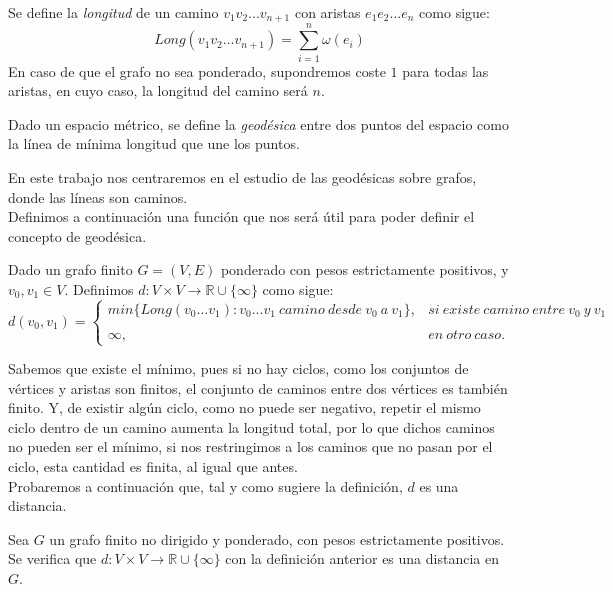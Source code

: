 \begin{definicion}
	Se define la \textit{longitud} de un camino $v_1v_2...v_{n+1}$ con aristas $e_1e_2...e_n$ como sigue: 
	$$Long(v_1v_2...v_{n+1}) = \sum_{i=1}^{n}\omega(e_i)$$
	En caso de que el grafo no sea ponderado, supondremos coste $1$ para todas las aristas, en cuyo caso, la longitud del camino será $n$.
\end{definicion}

\begin{definicion}
	Dado un espacio métrico, se define la \textit{geodésica} entre dos puntos del espacio como la línea de mínima longitud que une los puntos.
\end{definicion}

En este trabajo nos centraremos en el estudio de las geodésicas sobre grafos, donde las líneas son caminos. \\

Definimos a continuación una función que nos será útil para poder definir el concepto de geodésica.

\begin{definicion}\label{def:dist}
	Dado un grafo finito $G=(V,E)$ ponderado con pesos estrictamente positivos,  y $v_0,v_1\in V$. Definimos $d:V\times V \rightarrow \mathbb{R}\cup \{\infty\}$ como sigue:
	$$d(v_0,v_1)= \left\{ \begin{array}{lcc}
		min\{Long(v_0...v_1) : v_0...v_1\ camino\ desde\ v_0\ a\ v_1\}, &   si\ existe\ camino\ entre\ v_0\ y\ v_1 \\
		\\ \infty, &  en\ otro\ caso.
	\end{array}
	\right.$$
\end{definicion}

Sabemos que existe el mínimo, pues si no hay ciclos, como los conjuntos de vértices y aristas son finitos, el conjunto de caminos entre dos vértices es también finito. Y, de existir algún ciclo, como no puede ser negativo, repetir el mismo ciclo dentro de un camino aumenta la longitud total, por lo que dichos caminos no pueden ser el mínimo, si nos restringimos a los caminos que no pasan por el ciclo, esta cantidad es finita, al igual que antes. \\

Probaremos a continuación que, tal y como sugiere la definición, $d$ es una distancia.

\begin{proposicion}\label{prop:distancia}
	Sea $G$ un grafo finito no dirigido y ponderado, con pesos estrictamente positivos. Se verifica que $d:V\times V \rightarrow \mathbb{R}\cup \{\infty\}$ con la definición anterior es una distancia en $G$.
\end{proposicion}

